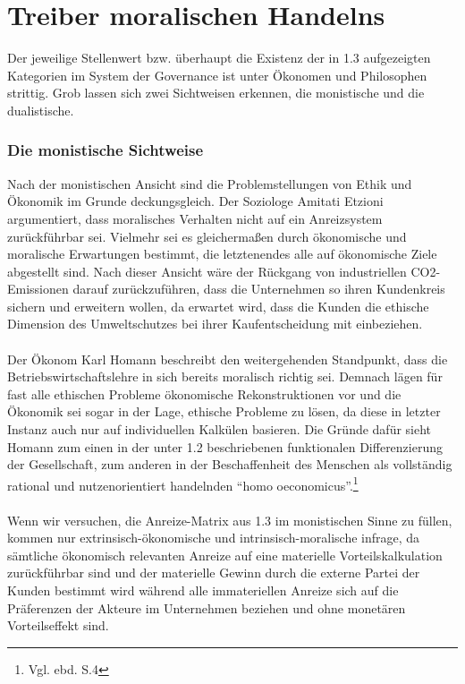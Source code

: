 \documentclass[12pt]{article}
\begin{document}
\part{Treiber moralischen Handelns}
Der jeweilige Stellenwert bzw. überhaupt die Existenz der in 1.3 aufgezeigten Kategorien im System der Governance ist unter Ökonomen und Philosophen strittig. Grob lassen sich zwei Sichtweisen erkennen, die monistische und die dualistische.
\section{Die monistische Sichtweise}
Nach der monistischen Ansicht sind die Problemstellungen von Ethik und Ökonomik im Grunde deckungsgleich. Der Soziologe Amitati Etzioni argumentiert, dass moralisches Verhalten nicht auf ein Anreizsystem zurückführbar sei. Vielmehr sei es gleichermaßen durch ökonomische und moralische Erwartungen bestimmt, die letztenendes alle auf ökonomische Ziele abgestellt sind. Nach dieser Ansicht wäre der Rückgang von industriellen CO2-Emissionen darauf zurückzuführen, dass die Unternehmen so ihren Kundenkreis sichern und erweitern wollen, da erwartet wird, dass die Kunden die ethische Dimension des Umweltschutzes bei ihrer Kaufentscheidung mit einbeziehen.\\
\\
Der Ökonom Karl Homann beschreibt den weitergehenden Standpunkt, dass die Betriebswirtschaftslehre in sich bereits moralisch richtig sei. Demnach lägen für fast alle ethischen Probleme ökonomische Rekonstruktionen vor und die Ökonomik sei sogar in der Lage, ethische Probleme zu lösen, da diese in letzter Instanz auch nur auf individuellen Kalkülen basieren. Die Gründe dafür sieht Homann zum einen in der unter 1.2 beschriebenen funktionalen Differenzierung der Gesellschaft, zum anderen in der Beschaffenheit des Menschen als vollständig rational und nutzenorientiert handelnden “homo oeconomicus”.\footnote{Vgl. ebd. S.4}\\
\\
Wenn wir versuchen, die Anreize-Matrix aus 1.3 im monistischen Sinne zu füllen, kommen nur extrinsisch-ökonomische und intrinsisch-moralische infrage, da sämtliche ökonomisch relevanten Anreize auf eine materielle Vorteilskalkulation zurückführbar sind und der materielle Gewinn durch die externe Partei der Kunden bestimmt wird während alle immateriellen Anreize sich auf die Präferenzen der Akteure im Unternehmen beziehen und ohne monetären Vorteilseffekt sind.
\end{document}
